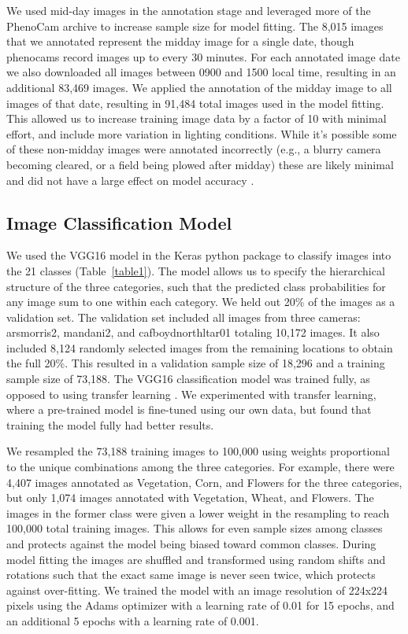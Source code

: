 \documentclass[remotesensing,article,submit,moreauthors,pdftex]{Definitions/mdpi}
\begin{document}
We used mid-day images in the annotation stage and leveraged more of the PhenoCam archive to increase sample size for model fitting. The 8,015 images that we annotated represent the midday image for a single date, though phenocams record images up to every 30 minutes. For each annotated image date we also downloaded all images between 0900 and 1500 local time, resulting in an additional 83,469 images. We applied the annotation of the midday image to all images of that date, resulting in 91,484 total images used in the model fitting. This allowed us to increase training image data by a factor of 10 with minimal effort, and include more variation in lighting conditions. While it’s possible some of these non-midday images were annotated incorrectly (e.g., a blurry camera becoming cleared, or a field being plowed after midday) these are likely minimal and did not have a large effect on model accuracy \citep{norouzzadeh2018}. 

\subsection{Image Classification Model}

We used the VGG16 model in the Keras python package to classify images into the 21 classes (Table~\ref{table1})\citep{simonyan2014-VGG16, chollet2018-keras}. The model allows us to specify the hierarchical structure of the three categories, such that the predicted class probabilities for any image sum to one within each category. We held out 20\% of the images as a validation set. The validation set included all images from three cameras: arsmorris2, mandani2, and cafboydnorthltar01 totaling 10,172 images. It also included 8,124 randomly selected images from the remaining locations to obtain the full 20\%. This resulted in a validation sample size of 18,296 and a training sample size of 73,188. The VGG16 classification model was trained fully, as opposed to using transfer learning \citep{norouzzadeh2018}. We experimented with transfer learning, where a pre-trained model is fine-tuned using our own data, but found that training the model fully had better results. 

We resampled the 73,188 training images to 100,000 using weights proportional to the unique combinations among the three categories. For example, there were 4,407 images annotated as Vegetation, Corn, and Flowers for the three categories, but only 1,074 images annotated with Vegetation, Wheat, and Flowers. The images in the former class were given a lower weight in the resampling to reach 100,000 total training images. This allows for even sample sizes among classes and protects against the model being biased toward common classes. During model fitting the images are shuffled and transformed using random shifts and rotations such that the exact same image is never seen twice, which protects against over-fitting. We trained the model with an image resolution of 224x224 pixels using the Adams optimizer with a learning rate of 0.01 for 15 epochs, and an additional 5 epochs with a learning rate of 0.001.
\end{document}
